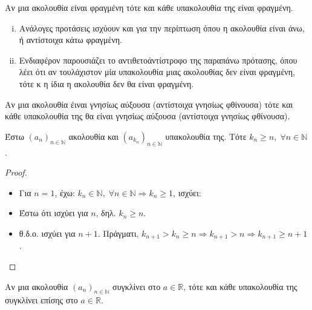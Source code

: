 \documentclass[main.tex]{subfiles}
\begin{document}

\begin{prop}
    Αν μια ακολουθία είναι φραγμένη τότε και κάθε υπακολουθία της 
    είναι φραγμένη.
\end{prop}

\begin{rem}
\item {}
    \begin{enumerate}[i)]
        \item Ανάλογες προτάσεις ισχύουν και για την περίπτωση όπου η 
            ακολουθία είναι άνω, ή αντίστοιχα κάτω φραγμένη.
        \item 
            Ενδιαφέρον παρουσιάζει το αντιθετοάντίστροφο της παραπάνω 
            πρότασης, όπου λέει ότι αν τουλάχιστον μία υπακολουθία μιας 
            ακολουθίας δεν είναι φραγμένη, τότε κ η ίδια η ακολουθία 
            δεν θα είναι φραγμένη.
    \end{enumerate}
\end{rem}

\begin{prop}
    Αν μια ακολουθία έιναι γνησίως αύξουσα (αντίστοιχα γνησίως φθίνουσα) 
    τότε και κάθε υπακολουθία της θα είναι γνησίως αύξουσα (αντίστοιχα 
    γνησίως φθίνουσα).
\end{prop}

\begin{lem}\label{lem:kn}
    Έστω $ (a_{n})_{n \in \mathbb{N}} $ ακολουθία και $ (a_{k_{n}})_
    {n \in \mathbb{N}} $ υπακολουθία της. Τότε $ k_{n} \geq n, \; 
    \forall n \in \mathbb{N} $.
\end{lem}

\begin{proof}
\item {}
    \begin{itemize}
        \item Για $ n=1 $, έχω: $ k_{n} \in \mathbb{N}, \; \forall n 
            \in \mathbb{N} \Rightarrow k_{n} \geq 1 $, ισχύει:
        \item Έστω ότι ισχύει για $ n $, δηλ. $ k_{n} \geq n $. 
        \item θ.δ.ο. ισχύει για $ n+1 $. Πράγματι, $ k_{n+1} > k_{n} 
            \geq n \Rightarrow k_{n+1} > n \Rightarrow k_{n+1} 
            \geq n+1$.
    \end{itemize}
\end{proof}

\begin{prop}
    Αν μια ακολουθία $ (a_{n})_{n \in \mathbb{N}} $ συγκλίνει στο $ a 
    \in \mathbb{R} $, τότε και κάθε υπακολουθία της συγκλίνει επίσης 
    στο $ a \in \mathbb{R} $.
\end{prop}
\end{document}

